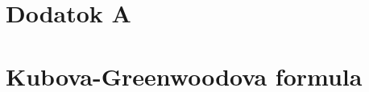 

\newpage
  \appendix
  \section*{Dodatok A}

\section{Kubova-Greenwoodova formula}
\label{sec:kubo A}

